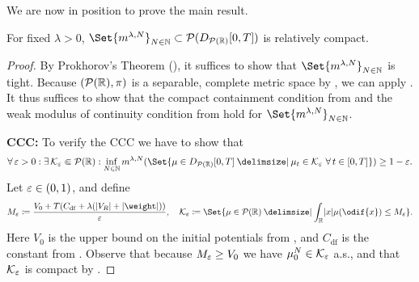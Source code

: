 We are now in position to prove the main result.

\begin{theorem}
  For fixed \(\lambda > 0\), \(\Set{ \lawmu^{\lambda, N} }_{N\in\bN} \subset \cP(D_{\cP(\potspace)}[0,T])\) is relatively compact.
\end{theorem}

\begin{proof}
  By Prokhorov's Theorem (), it suffices to show that \(\Set{ \lawmu^{\lambda, N} }_{N\in\bN}\) is tight.
  Because \((\mathcal{P}(\mathbb{R}), \pi)\) is a separable, complete metric space by , we can apply .
  It thus suffices to show that the compact containment condition from  and the weak modulus of continuity condition from  hold for \( \Set{ \lawmu^{\lambda, N} }_{N\in\bN} \).

  \textbf{CCC:}
  To verify the CCC we have to show that
  \begin{equation}
    \forall \eps > 0 : \exists \cK_\eps \Subset \cP(\potspace) :
    \inf_{N\in\bN} \lawmu^{\lambda, N} ( \Set{ \mu \in D_{\cP(\potspace)}[0,T] \given \mu_t \in \cK_\eps\ \forall t \in [0,T] } ) \geq 1 - \eps.
  \end{equation}
  Let \(\varepsilon \in (0,1)\), and define
  \begin{equation}
    M_\eps \coloneqq \frac{V_0 + T ( C_\mathrm{df} + \lambda (\abs{V_R} + \abs{\weight}) )}{\eps},
    \quad
    \cK_\eps \coloneqq \Set{ \mu \in \cP(\potspace) \given \int_\potspace \abs{x} \mu(\odif{x}) \leq M_\eps }.
  \end{equation}
  Here \( V_0 \) is the upper bound on the initial potentials from , and \( C_\mathrm{df} \) is the constant from .
  Observe that because \( M_\varepsilon \geq V_0 \) we have \( \mu_0^N \in \mathcal{K}_\varepsilon \) a.s., and that \( \mathcal{K}_\varepsilon \) is compact by .


\end{proof}
